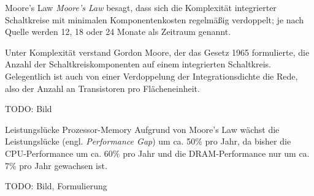\begin{defi}{Moore's Law}
    \emph{Moore's Law} besagt, dass sich die Komplexität integrierter Schaltkreise mit minimalen Komponentenkosten regelmäßig verdoppelt; je nach Quelle werden 12, 18 oder 24 Monate als Zeitraum genannt.

    Unter Komplexität verstand Gordon Moore, der das Gesetz 1965 formulierte, die Anzahl der Schaltkreiskomponenten auf einem integrierten Schaltkreis. Gelegentlich ist auch von einer Verdoppelung der Integrationsdichte die Rede, also der Anzahl an Transistoren pro Flächeneinheit.

    TODO: Bild
\end{defi}

\begin{bonus}{Leistungslücke Prozessor-Memory}
    Aufgrund von Moore's Law wächst die Leistungslücke (engl. \emph{Performance Gap}) um ca. 50\% pro Jahr, da bisher die CPU-Performance um ca. 60\% pro Jahr und die DRAM-Performance nur um ca. 7\% pro Jahr gewachsen ist.

    TODO: Bild, Formulierung
\end{bonus}
